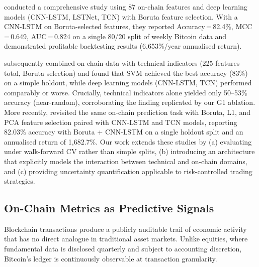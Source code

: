 \documentclass[final,3p,times,authoryear]{elsarticle}
\begin{document}
\citet{omole2024financial} conducted a comprehensive study
using 87 on-chain features and deep learning models (CNN-LSTM, LSTNet,
TCN) with Boruta feature selection.
With a CNN-LSTM on Boruta-selected features, they reported
Accuracy\,=\,82.4\%, MCC\,=\,0.649, AUC\,=\,0.824 on a single 80/20
split of weekly Bitcoin data and demonstrated profitable backtesting
results (6{,}653\%/year annualised return).

\citet{omole2025eaai} subsequently combined
on-chain data with technical indicators (225 features total, Boruta
selection) and found that SVM achieved the best accuracy (83\%) on a
simple holdout, while deep learning models (CNN-LSTM, TCN) performed
comparably or worse.
Crucially, technical indicators alone yielded only 50--53\% accuracy
(near-random), corroborating the finding replicated by our G1
ablation.
More recently, \citet{dubey2025bitcoin} revisited the same on-chain
prediction task with Boruta, L1, and PCA feature selection paired with
CNN-LSTM and TCN models, reporting 82.03\% accuracy with Boruta +
CNN-LSTM on a single holdout split and an annualised return of
1{,}682.7\%.
Our work extends these studies by (a) evaluating under walk-forward CV
rather than simple splits, (b) introducing an architecture that
explicitly models the interaction between technical and on-chain domains,
and (c) providing uncertainty quantification applicable to risk-controlled
trading strategies.

\subsection{On-Chain Metrics as Predictive Signals}

Blockchain transactions produce a publicly auditable trail of economic
activity that has no direct analogue in traditional asset markets.
Unlike equities, where fundamental data is disclosed quarterly and
subject to accounting discretion, Bitcoin's ledger is continuously
observable at transaction granularity.
\end{document}
